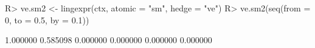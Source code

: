 \begin{Schunk}
% --begin: "lingexpr"
\begin{Sinput}
R> ve.sm2 <- lingexpr(ctx, atomic = "sm", hedge = "ve")
R> ve.sm2(seq(from = 0, to = 0.5, by = 0.1))
\end{Sinput}
\begin{Soutput}
[1] 1.000000 0.585098 0.000000 0.000000 0.000000 0.000000
\end{Soutput}
%
% --end: "lingexpr"
\end{Schunk}
